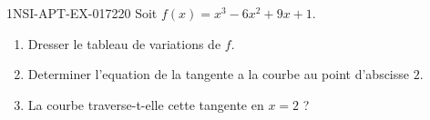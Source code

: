 \begin{exercice}{1NSI-APT-EX-017}{2}{20}
Soit $f(x) = x^3 - 6x^2 + 9x + 1$.
\begin{enumerate}
  \item Dresser le tableau de variations de $f$.
  \item Determiner l'equation de la tangente a la courbe au point d'abscisse $2$.
  \item La courbe traverse-t-elle cette tangente en $x = 2$ ?
\end{enumerate}

\end{exercice}
